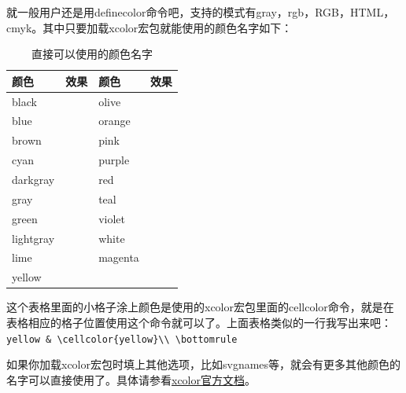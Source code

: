 \documentclass[12pt,oneside]{book}
\begin{document}
\begin{common-format}
就一般用户还是用definecolor命令吧，支持的模式有gray，rgb，RGB，HTML，cmyk。其中只要加载xcolor宏包就能使用的颜色名字如下：
\begin{table}[H]
\centering
\begin{tabular}{@{}lp{50pt}lp{50pt}@{}}
\toprule
颜色        & 效果  & 颜色       & 效果\\ \midrule
black     &  \cellcolor{black}  & olive     &    \cellcolor{olive} \\
blue      &   \cellcolor{blue} & orange    &   \cellcolor{orange}\\
brown     &  \cellcolor{brown}  & pink      &   \cellcolor{pink}\\
cyan      &   \cellcolor{cyan} & purple    &   \cellcolor{purple}\\
darkgray  &  \cellcolor{darkgray} &red       &   \cellcolor{red}  \\
gray      &   \cellcolor{gray} & teal      &    \cellcolor{teal}\\
green     &   \cellcolor{green} & violet    &   \cellcolor{violet}\\
lightgray &  \cellcolor{lightgray} &white     &   \cellcolor{white} \\
lime      &    \cellcolor{lime} & magenta   &   \cellcolor{magenta} \\
yellow    &    \cellcolor{yellow}\\ \bottomrule
\end{tabular}
\label{tab:直接可以使用的颜色名字}
\caption{直接可以使用的颜色名字}
\end{table}
这个表格里面的小格子涂上颜色是使用的xcolor宏包里面的cellcolor命令，就是在表格相应的格子位置使用这个命令就可以了。上面表格类似的一行我写出来吧：\\
\verb+yellow & \cellcolor{yellow}\\ \bottomrule+

如果你加载xcolor宏包时填上其他选项，比如svgnames等，就会有更多其他颜色的名字可以直接使用了。具体请参看\href{http://mirrors.ctan.org/macros/latex/contrib/xcolor/xcolor.pdf}{xcolor官方文档}。



\end{common-format}
\end{document}
